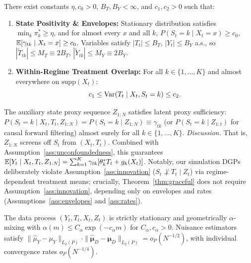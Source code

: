 \begin{assumption}
\label{ass:overlap}
\label{ass:nonsingularity}
\label{ass:envelopes}
There exist constants $\eta, c_0 > 0$, $B_T, B_Y < \infty$, and $c_1, c_2 > 0$ such that:
\begin{enumerate}\setlength{\itemsep}{0pt}\setlength{\parskip}{0pt}
    \item \textbf{State Positivity \& Envelopes:} Stationary distribution satisfies $\min_{k} \pi_k^* \ge \eta$, and for almost every $x$ and all $k$, $P(S_t = k \mid X_t=x) \ge c_0$, $\mathbb{E}[\gamma_{tk} \mid X_t=x] \ge c_0$. Variables satisfy $|T_t| \le B_T$, $|Y_t| \le B_Y$ a.s., so $|\tilde{T}_{tk}| \le M_T \equiv 2B_T$, $|\tilde{Y}_{tk}| \le M_Y \equiv 2B_Y$.
    \item \textbf{Within-Regime Treatment Overlap:} For all $k \in \{1, \dots, K\}$ and almost everywhere on $\mathrm{supp}(X_t)$:
    \begin{equation}
        c_1 \le \mathrm{Var}(T_t \mid X_t, S_t = k) \le c_2.
    \end{equation}
\end{enumerate}
\end{assumption}

\begin{assumption}
\label{ass:innovation}
The auxiliary state proxy sequence $Z_{1:N}$ satisfies latent proxy sufficiency: $P(S_t = k \mid X_t, T_t, Z_{1:N}) = P(S_t = k \mid Z_{1:N}) \equiv \gamma_{tk}$ (or $P(S_t = k \mid Z_{1:t})$ for causal forward filtering) almost surely for all $k \in \{1, \dots, K\}$.
\textit{Discussion.} That is, $Z_{1:N}$ screens off $S_t$ from $(X_t, T_t)$. Combined with Assumption~\ref{ass:unconfoundedness}, this guarantees $\mathbb{E}[Y_t \mid X_t, T_t, Z_{1:N}] = \sum_{k=1}^K \gamma_{tk} [\theta_k^* T_t + g_k(X_t)]$. Notably, our simulation DGPs deliberately violate Assumption~\ref{ass:innovation} ($S_t \not\perp T_t \mid Z_t$) via regime-dependent treatment means; crucially, Theorem~\ref{thm:graceful} does not require Assumption~\ref{ass:innovation}, depending only on envelopes and rates (Assumptions~\ref{ass:envelopes} and \ref{ass:rates}).
\end{assumption}

\begin{assumption}
\label{ass:rates}
\label{ass:mixing}
The data process $(Y_t, T_t, X_t, Z_t)$ is strictly stationary and geometrically $\alpha$-mixing with $\alpha(m) \le C_\alpha \exp(-c_\alpha m)$ for $C_\alpha, c_\alpha > 0$. Nuisance estimators satisfy $\|\hat{\mu}_Y - \mu_Y\|_{L_2(P)} \cdot \|\hat{\boldsymbol{\mu}}_D - \boldsymbol{\mu}_D\|_{L_2(P)} = o_P(N^{-1/2})$, with individual convergence rates $o_P(N^{-1/4})$.
\end{assumption}

